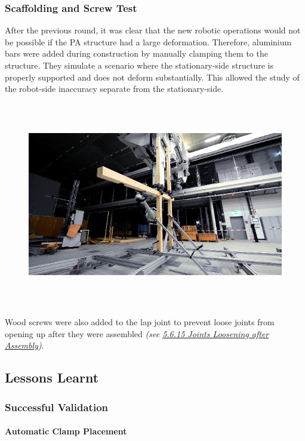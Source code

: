 \documentclass[11pt]{book}
\begin{document}
\subsubsection{Scaffolding and Screw Test}

After the previous round, it was clear that the new robotic operations would not be possible if the PA structure had a large deformation. Therefore, aluminium bars were added during construction by manually clamping them to the structure. They simulate a scenario where the stationary-side structure is properly supported and does not deform substantially. This allowed the study of the robot-side inaccuracy separate from the stationary-side.

\begin{figure}[H]
\includegraphics[width=15.92cm,height=8.96cm]{./images/image70.jpeg}
\end{figure}


Wood screws were also added to the lap joint to prevent loose joints from opening up after they were assembled \textit{\textcolor[HTML]{B7B7B7}{(see \uline{5.6.15 Joints Loosening after Assembly})}}. 

\subsection{Lessons Learnt}

\subsubsection{Successful Validation}

\paragraph{Automatic Clamp Placement}
\end{document}

